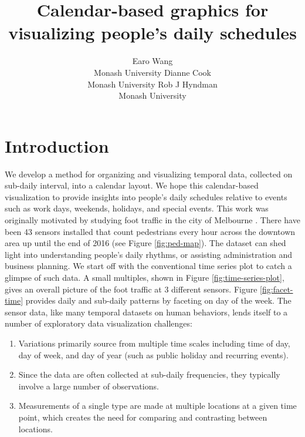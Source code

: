 \documentclass[article]{jss}
\author{
Earo Wang\\Monash University \And Dianne Cook\\Monash University \And Rob J Hyndman\\Monash University
}
\title{Calendar-based graphics for visualizing people's daily schedules}
\providecommand{\tightlist}{%
  \setlength{\itemsep}{0pt}\setlength{\parskip}{0pt}}
\theoremstyle{definition}
\theoremstyle{definition}
\theoremstyle{remark}
\begin{document}
\section{Introduction}\label{introduction}

We develop a method for organizing and visualizing temporal data,
collected on sub-daily interval, into a calendar layout. We hope this
calendar-based visualization to provide insights into people's daily
schedules relative to events such as work days, weekends, holidays, and
special events. This work was originally motivated by studying foot
traffic in the city of Melbourne \citep{ped}. There have been 43 sensors
installed that count pedestrians every hour across the downtown area up
until the end of 2016 (see Figure \ref{fig:ped-map}). The dataset can
shed light into understanding people's daily rhythms, or assisting
administration and business planning. We start off with the conventional
time series plot to catch a glimpse of such data. A small multiples,
shown in Figure \ref{fig:time-series-plot}, gives an overall picture of
the foot traffic at 3 different sensors. Figure \ref{fig:facet-time}
provides daily and sub-daily patterns by faceting on day of the week.
The sensor data, like many temporal datasets on human behaviors, lends
itself to a number of exploratory data visualization challenges:

\begin{enumerate}
\def\labelenumi{\arabic{enumi}.}
\tightlist
\item
  Variations primarily source from multiple time scales including time
  of day, day of week, and day of year (such as public holiday and
  recurring events).
\item
  Since the data are often collected at sub-daily frequencies, they
  typically involve a large number of observations.
\item
  Measurements of a single type are made at multiple locations at a
  given time point, which creates the need for comparing and contrasting
  between locations.
\end{enumerate}
\end{document}
